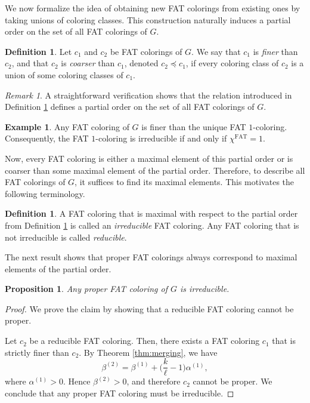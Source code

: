 \documentclass{article}
\theoremstyle{plain}
\newtheorem{proposition}[theorem]{Proposition}
\theoremstyle{definition}
\newtheorem{definition}[theorem]{Definition}
\newtheorem{example}[theorem]{Example}
\theoremstyle{remark}
\newtheorem{remark}[theorem]{Remark}
\begin{document}
We now formalize the idea of obtaining new FAT colorings from existing ones by taking unions of coloring classes.
This construction naturally induces a partial order on the set of all FAT colorings of $G$.
\begin{definition}\label{def:po}
    Let $c_1$ and $c_2$ be FAT colorings of $G$. 
    We say that $c_1$ is \emph{finer} than $c_2$, and that $c_2$ is \emph{coarser} than $c_1$, denoted $c_2\preceq c_1$, if every coloring class of $c_2$ is a union of some coloring classes of $c_1$.
\end{definition}

\begin{remark}
    A straightforward verification shows that the relation introduced in Definition \ref{def:po} defines a partial order on the set of all FAT colorings of $G$.    
\end{remark}

\begin{example}
    Any FAT coloring of $G$ is finer than the unique FAT $1$-coloring. Consequently, the FAT $1$-coloring is irreducible if and only if $\chi^{\mathrm{FAT}}=1$.
\end{example}
Now, every FAT coloring is either a maximal element of this partial order or is coarser than some maximal element of the partial order.
Therefore, to describe all FAT colorings of $G$, it suffices to find its maximal elements.
This motivates the following terminology.
\begin{definition}
    A FAT coloring that is maximal with respect to the partial order from Definition \ref{def:po} is called an \emph{irreducible} FAT coloring.
    Any FAT coloring that is not irreducible is called \emph{reducible}.
\end{definition}


    
The next result shows that proper FAT colorings always correspond to maximal elements of the partial order.
\begin{proposition}
    Any proper FAT coloring of $G$ is irreducible.
\end{proposition}
\begin{proof}
   We prove the claim by showing that a reducible FAT coloring cannot be proper.
   
    Let $c_2$ be a reducible FAT coloring. Then, there exists a FAT coloring $c_1$ that is strictly finer than $c_2$.
    By Theorem \ref{thm:merging}, we have
    \[
    \beta^{(2)} = \beta^{(1)} + \biggl(\frac k\ell - 1 \biggr)\alpha^{(1)},
    \]
    where $\alpha^{(1)}>0$. Hence $\beta^{(2)}>0$, and  therefore $c_2$ cannot be proper.
    We conclude that any proper FAT coloring must be irreducible.
\end{proof}
\end{document}
